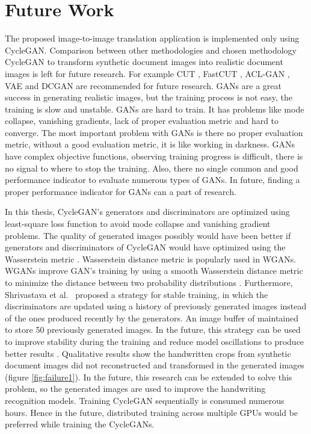 \section{Future Work}\label{FutureWork}

The proposed image-to-image translation application is implemented only using \ac{CycleGAN}. Comparison between other methodologies and chosen methodology \ac{CycleGAN} to transform synthetic document images into realistic document images is left for future research. For example \ac{CUT} \cite{park2020contrastive}, \ac{FastCUT} \cite{park2020contrastive}, \ac{ACL-GAN} \cite{zhao2021unpaired}, \ac{VAE} \cite{Kingma_2019} and \ac{DCGAN} \cite{radford2016unsupervised} are recommended for future research. \acp{GAN} are a great success in generating realistic images, but the training process is not easy, the training is slow and unstable. \acp{GAN} are hard to train. It has problems like mode collapse, vanishing gradients, lack of proper evaluation metric and hard to converge. The most important problem with \acp{GAN} is there no proper evaluation metric, without a good evaluation metric, it is like working in darkness. \acp{GAN} have complex objective functions, observing training progress is difficult, there is no signal to where to stop the training. Also, there no single common and good performance indicator to evaluate numerous types of \acp{GAN}. In future, finding a proper performance indicator for \acp{GAN} can a part of research. 

In this thesis, \ac{CycleGAN}'s generators and discriminators are optimized using least-square loss function \cite{mao2017squares} to avoid mode collapse and vanishing gradient problems. The quality of generated images possibly would have been better if generators and discriminators of \ac{CycleGAN} would have optimized using the Wasserstein metric \cite{arjovsky2017wasserstein}. Wasserstein distance metric is popularly used in \acp{WGAN}. \acp{WGAN} improve \ac{GAN}'s training by using a smooth Wasserstein distance metric to minimize the distance between two probability distributions \cite{arjovsky2017wasserstein}. Furthermore, Shrivastava et al.\ \cite{shrivastava2017learning} proposed a strategy for stable training, in which the discriminators are updated using a history of previously generated images instead of the ones produced recently by the generators. An image buffer of maintained to store 50 previously generated images. In the future, this strategy can be used to improve stability during the training and reduce model oscillations to produce better results \cite{shrivastava2017learning}. Qualitative results show the handwritten crops from synthetic document images did not reconstructed and transformed in the generated images (figure \ref{fig:failure1}). In the future, this research can be extended to solve this problem, so the generated images are used to improve the handwriting recognition models. Training \ac{CycleGAN} sequentially is consumed numerous hours. Hence in the future, distributed training across multiple GPUs would be preferred while training the \acp{CycleGAN}.

